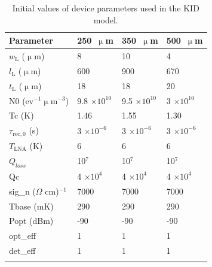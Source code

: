\begin{table}[!htbp]
\centering
\begin{tabular}{@{}llll@{}}
\dtoprule
Parameter                         & 250~$\upmu$m         & 350~$\upmu$m         & 500~$\upmu$m         \\ \midrule
$w_{\mathrm{L}}$ ($\upmu$m)                  & 8                  & 10                 & 4                  \\
$l_{\mathrm{L}}$ ($\upmu$m)                  & 600                & 900                & 670                \\
$t_{\mathrm{L}}$ ($\upmu$m)                  & 18                 & 18                 & 20                 \\
\gls{N0} (ev$^{-1}$$\upmu$m$^{-3}$)     & 9.8 $\times 10^{10}$ & 9.5 $\times 10^{10}$ & 3 $\times 10^{10}$ \\
\gls{Tc} (K)                         & 1.46               & 1.55               & 1.30               \\
$\tau_{\mathrm{rec},0}$ (s)                    & 3 $\times 10^{-6}$ & 3 $\times 10^{-6}$ & 3 $\times 10^{-6}$ \\
$T_{\mathrm{LNA}}$ (K)            & 6                  & 6                  & 6                  \\
$Q_{loss}$                        & 10$^{7}$           & 10$^{7}$           & 10$^{7}$           \\
\gls{Qc}                           & 4 $\times 10^{4}$  & 4 $\times 10^{4}$  & 4 $\times 10^{4}$  \\
\gls{sig_n} ($\Omega$ cm)$^{-1}$ & 7000               & 7000               & 7000               \\
\gls{Tbase} (mK)          & 290                & 290                & 290                \\
\gls{Popt} (dBm)          & -90                & -90                & -90                \\
\gls{opt_eff}                     & 1                  & 1                  & 1                \\
\gls{det_eff}                     & 1                  & 1                  & 1                \\
\dbottomrule
\\
\end{tabular}
\centering
\caption[~Initial values of device parameters used in the KID model.]{Initial values of device parameters used in the KID model.}
\label{table:kid sim}
\end{table}

